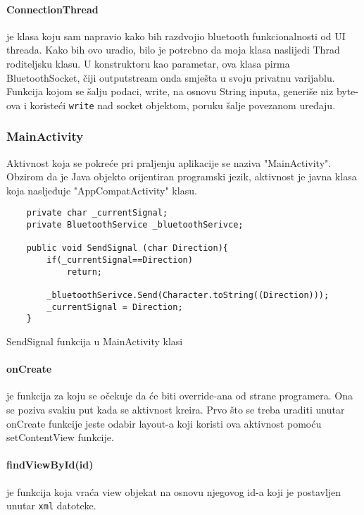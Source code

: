 \documentclass[../Document.tex]{subfiles}
\begin{document}
\paragraph{ConnectionThread} je klasa koju sam napravio kako bih razdvojio bluetooth funkcionalnosti od UI threada. Kako bih ovo uradio, bilo je potrebno da moja klasa naslijedi Thrad roditeljsku klasu. U konstruktoru kao parametar, ova klasa pirma BluetoothSocket, čiji outputstream onda smješta u svoju privatnu varijablu. Funkcija kojom se šalju podaci, write, na osnovu String inputa, generiše niz byte-ova i koristeći \verb|write| nad socket objektom, poruku šalje povezanom uređaju.

\subsubsection{MainActivity}
Aktivnost koja se pokreće pri praljenju aplikacije se naziva "MainActivity". Obzirom da je Java objekto orijentiran programski jezik, aktivnost je javna klasa koja nasljeđuje "AppCompatActivity" klasu.

\begin{code}
    \begin{verbatim}
    private char _currentSignal;
    private BluetoothService _bluetoothSerivce;
    
    public void SendSignal (char Direction){
        if(_currentSignal==Direction)
            return;
    
        _bluetoothSerivce.Send(Character.toString((Direction)));
        _currentSignal = Direction;
    }
    \end{verbatim}
    \caption{SendSignal funkcija u MainActivity klasi}
\end{code}

\paragraph{onCreate} je funkcija za koju se očekuje da će biti override-ana od strane programera. Ona se poziva svakiu put kada se aktivnost kreira. Prvo što se treba uraditi unutar onCreate funkcije jeste odabir layout-a koji koristi ova aktivnost pomoću setContentView funkcije.

\paragraph{findViewById(id)} je funkcija koja vraća view objekat na osnovu njegovog id-a koji je postavljen unutar \verb|xml| datoteke.
\end{document}
